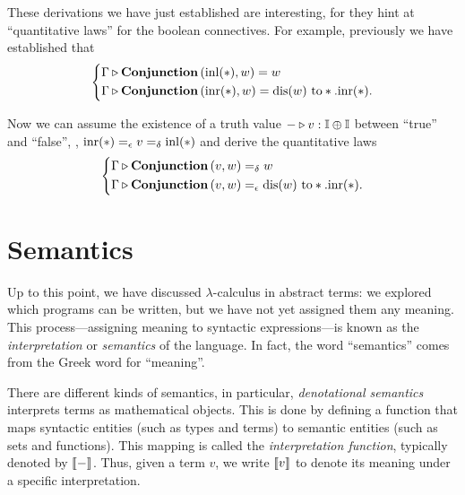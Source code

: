 These derivations we have just established are interesting, for they hint at ``quantitative laws'' for the boolean connectives. For example, previously we have established that
\[
      \left\{
      \begin{aligned}
      & \Gamma \triangleright \textbf{Conjunction} \, (\mathrm{inl}(*),w) = w  \\
      & \Gamma \triangleright \textbf{Conjunction} \, (\mathrm{inr}(*), w) = \text{dis}(w) \text{ to} *. \mathrm{inr}(*).
      \end{aligned}
      \right.
      \]

Now we can assume the existence of a truth value $- \triangleright v: \mathbb{I} \oplus \mathbb{I}$ between ``true'' and ``false'', \ie,
$\mathrm{inr}(*) =_{\epsilon} v  =_{\delta} \mathrm{inl}(*)$
and derive the quantitative laws
\[
      \left\{
      \begin{aligned}
      & \Gamma \triangleright \textbf{Conjunction} \, (v,w) =_{\delta} w  \\
      & \Gamma \triangleright \textbf{Conjunction} \, (v, w) =_{\epsilon} \text{dis}(w) \text{ to} *. \mathrm{inr}(*).
      \end{aligned}
      \right.
      \]


 

 










\section{Semantics} \label{sec: Lambda Calculus:Interpretation}


Up to this point, we have discussed $\lambda$-calculus in abstract terms: we explored which programs can be written, but we have not yet assigned them any meaning. This process—assigning meaning to syntactic expressions—is known as the \emph{interpretation} or \emph{semantics} of the language. In fact, the word ``semantics'' comes from the Greek word for ``meaning''.

There are different kinds of semantics, in particular, \emph{denotational semantics} interprets terms as mathematical objects. This is done by defining a function that maps syntactic entities (such as types and terms) to semantic entities (such as sets and functions). This mapping is called the \emph{interpretation function}, typically denoted by $\left \llbracket - \right \rrbracket$. Thus, given a term $v$, we write $\left \llbracket v \right \rrbracket$ to denote its meaning under a specific interpretation.


